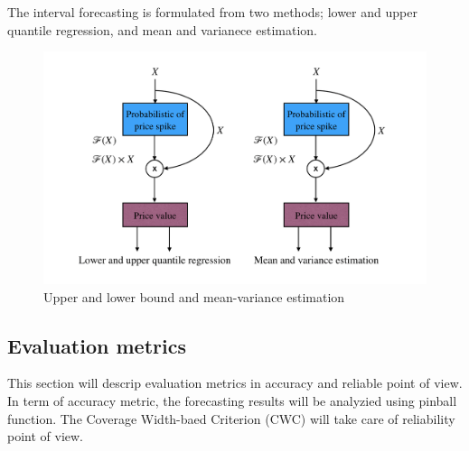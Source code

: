 \documentclass[review]{elsarticle}
\begin{document}
      The interval forecasting is formulated from two methods; lower and upper quantile regression, and mean and varianece estimation.
      \begin{figure}[H]
        \includegraphics[width=12cm]{UB_LB_MV_PDRNN}
        \caption{Upper and lower bound and mean-variance estimation}
        \label{Fig:UB_LB_MV_PDRNN}
        \centering
      \end{figure}

    \subsection{Evaluation metrics}
      This section will descrip evaluation metrics in accuracy and reliable point of view. In term of accuracy metric, the forecasting results will be analyzied using pinball function. The Coverage Width-baed Criterion (CWC) will take care of reliability point of view.
\end{document}
